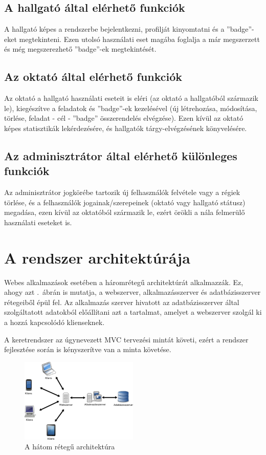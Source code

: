 \documentclass[a4paper,10pt,titlepage]{article}
\begin{document}
\subsection{A hallgató által elérhető funkciók}

A hallgató képes a rendszerbe bejelentkezni, profilját kinyomtatni és a ''badge''-eket megtekinteni. Ezen utolsó használati eset magába foglalja a már megszerzett és még megszerezhető ''badge''-ek megtekintését.

\subsection{Az oktató által elérhető funkciók}

Az oktató a hallgató használati eseteit is eléri (az oktató a hallgatóból származik le), kiegészítve a feladatok és ''badge''-ek kezelésével (új létrehozása, módosítása, törlése, feladat - cél - ''badge'' összerendelés elvégzése). Ezen kívül az oktató képes statisztikák lekérdezésére, és hallgatók tárgy-elvégzésének könyvelésére. 

\subsection{Az adminisztrátor által elérhető különleges funkciók}

Az adminisztrátor jogkörébe tartozik új felhasználók felvétele vagy a régiek törlése, és a felhasználók jogainak/szerepeinek (oktató vagy hallgató státusz) megadása, ezen kívül az oktatóból származik le, ezért örökli a nála felmerülő használati eseteket is.

\section{A rendszer architektúrája}

Webes alkalmazások esetében a háromrétegű architektúrát alkalmazzák. Ez, ahogy azt .~ábrán is mutatja, a webszerver, alkalmazásszerver és adatbázisszerver rétegeiből épül fel. Az alkalmazás szerver hivatott az adatbázisszerver által szolgáltatott adatokból előállítani azt a tartalmat, amelyet a webszerver szolgál ki a hozzá kapcsolódó klienseknek.

A keretrendszer az úgynevezett MVC tervezési mintát követi, ezért a rendszer fejlesztése során is kényszerítve van a minta követése. 

\begin{figure}[ht!]
\centering
\includegraphics[width=0.50\textwidth]{figures/3tier_simple.png}
\caption{A hátom rétegű architektúra \label{fig:3tier_simple}}
\end{figure}
\end{document}
